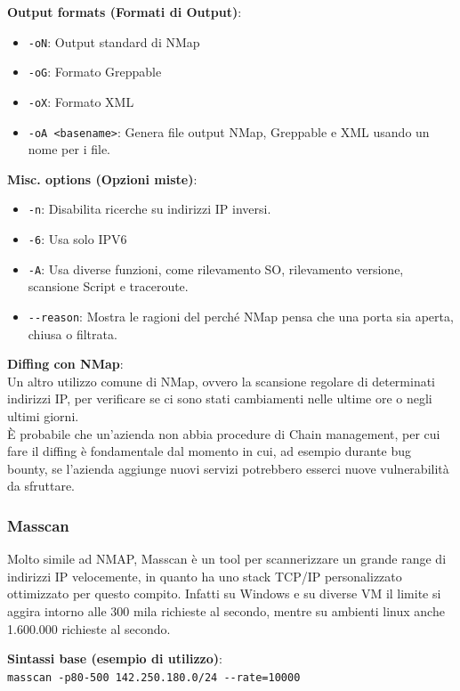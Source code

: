 \documentclass{article}
\begin{document}
\textbf{Output formats (Formati di Output)}:
\begin{itemize}
    \item \verb|-oN|: Output standard di NMap
    \item \verb|-oG|: Formato Greppable
    \item \verb|-oX|: Formato XML
    \item \verb|-oA <basename>|: Genera file output NMap, Greppable e XML usando un nome per i file.
\end{itemize}

\textbf{Misc. options (Opzioni miste)}:
\begin{itemize}
    \item \verb|-n|: Disabilita ricerche su indirizzi IP inversi.
    \item \verb|-6|: Usa solo IPV6
    \item \verb|-A|: Usa diverse funzioni, come rilevamento SO, rilevamento versione, scansione Script e traceroute.
    \item \verb|--reason|: Mostra le ragioni del perché NMap pensa che una porta sia aperta, chiusa o filtrata.
\end{itemize}

\textbf{Diffing con NMap}:\\
Un altro utilizzo comune di NMap, ovvero la scansione regolare di determinati indirizzi IP, per verificare se ci sono stati cambiamenti nelle ultime ore o negli ultimi giorni.\\ È probabile che un'azienda non abbia procedure di Chain management, per cui fare il diffing è fondamentale dal momento in cui, ad esempio durante bug bounty, se l'azienda aggiunge nuovi servizi potrebbero esserci nuove vulnerabilità da sfruttare.

\subsubsection{Masscan}
Molto simile ad NMAP, Masscan è un tool per scannerizzare un grande range di indirizzi IP velocemente, in quanto ha uno stack TCP/IP personalizzato ottimizzato per questo compito. Infatti su Windows e su diverse VM il limite si aggira intorno alle 300 mila richieste al secondo, mentre su ambienti linux anche 1.600.000 richieste al secondo.

\textbf{Sintassi base (esempio di utilizzo)}:\\
\verb|masscan -p80-500 142.250.180.0/24 --rate=10000|
\end{document}
